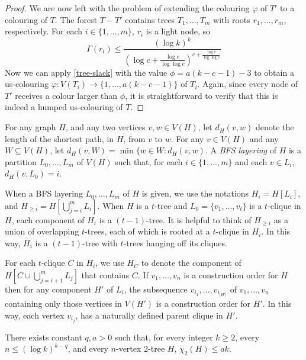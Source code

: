 \documentclass[kpfonts]{patmorin}
\newcommand{\uqs}{\chi_2}
\begin{document}
\begin{proof}
    We are now left with the problem of extending the colouring $\varphi$ of $T'$ to a colouring of $T$.  The forest $T-T'$ contains trees $T_1,\ldots,T_m$ with roots $r_1,\ldots,r_m$, respectively.  For each $i\in\{1,\ldots,m\}$, $r_i$ is a light node, so
    \[
        \Gamma(r_i) \le \frac{(\log k)^k}{\left(\log c + \frac{\log c}{\log\log c}\right)^{c+\frac{\log c}{\log\log c}}}
    \]
    Now we can apply \cref{tree-slack} with the value $\phi = a(k-c-1)-3$ to obtain a us-colouring $\varphi:V(T_i)\to\{1,\ldots,a(k-c-1)\}$ of $T_i$.  Again, since every node of $T'$ receives a colour larger than $\phi$, it is straightforward to verify that this is indeed a humped us-colouring of $T$.
\end{proof}


For any graph $H$, and any two vertices $v,w\in V(H)$, let $d_H(v,w)$ denote the length of the shortest path, in $H$, from $v$ to $w$. For any $v\in V(H)$ and any $W\subseteq V(H)$, let $d_H(v,W)=\min\{w\in W: d_H(v,w)$. A \emph{BFS layering} of $H$ is a partition $L_0,\ldots,L_m$ of $V(H)$ such that, for each $i\in\{1,\ldots,m\}$ and each $v\in L_i$, $d_H(v,L_0)=i$.

When a BFS layering $L_0,\ldots,L_m$ of $H$ is given, we use the notations $H_i=H[L_i]$, and $H_{\ge i}=H[\bigcup_{j=i}^m L_i]$.  When $H$ is a $t$-tree and $L_0=\{v_1,\ldots,v_t\}$ is a $t$-clique in $H$, each component of $H_i$ is a $(t-1)$-tree.  It is helpful to think of $H_{\ge i}$ as a union of overlapping $t$-trees, each of which is rooted at a $t$-clique in $H_i$. In this way, $H_i$ is a $(t-1)$-tree with $t$-trees hanging off its cliques.

For each $t$-clique $C$ in $H_i$, we use $H_C$ to denote the component of $H[C\cup\bigcup_{j=i+1}^m L_j]$ that contains $C$.  If $v_1,\ldots,v_n$ is a construction order for $H$ then for any component $H'$ of $L_i$, the subsequence $v_{i_1},\ldots,v_{i_|H'|}$ of $v_1,\ldots,v_n$ containing only those vertices in $V(H')$ is a construction order for $H'$.  In this way, each vertex $v_{i_j}$, has a naturally defined parent clique in $H'$.




\begin{thm}\label{two-tree-technical}
    There exists constant $q,a>0$ such that, for every integer $k\ge 2$, every $n\le (\log k)^{k-q}$, and every $n$-vertex 2-tree $H$, $\uqs(H)\le ak$.
\end{thm}
\end{document}
